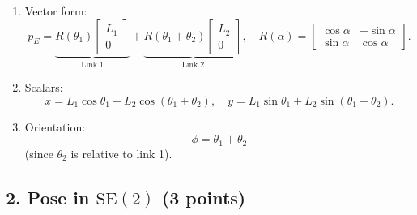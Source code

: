 \documentclass[11pt]{article}
\begin{document}
\begin{enumerate}[label=(\alph*)]
\item Vector form:
\[
p_E =
\underbrace{R(\theta_1)\!\begin{bmatrix}L_1\\0\end{bmatrix}}_{\text{Link 1}}
+
\underbrace{R(\theta_1+\theta_2)\!\begin{bmatrix}L_2\\0\end{bmatrix}}_{\text{Link 2}},
\quad
R(\alpha)=\begin{bmatrix}\cos\alpha&-\sin\alpha\\ \sin\alpha&\cos\alpha\end{bmatrix}.
\]

\item Scalars:
\[
x=L_1\cos\theta_1+L_2\cos(\theta_1+\theta_2),\quad
y=L_1\sin\theta_1+L_2\sin(\theta_1+\theta_2).
\]

\item Orientation:
\[
\phi=\theta_1+\theta_2
\]
(since $\theta_2$ is relative to link 1).
\end{enumerate}

\subsection*{2. Pose in $\mathrm{SE}(2)$ (3 points)}
\end{document}
